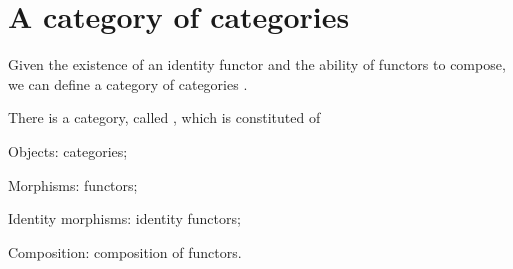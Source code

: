 \section{A category of categories}

Given the existence of an identity functor and the ability of functors to compose, we can define a category of categories \Category.

\begin{ctdefinition}
  \label{def:Category}
  There is a category, called \Category, which is constituted of
  \begin{compactitem}
    \item Objects: categories;
    \item Morphisms: functors;
    \item Identity morphisms: identity functors;
    \item Composition: composition of functors.
  \end{compactitem}
\end{ctdefinition}
